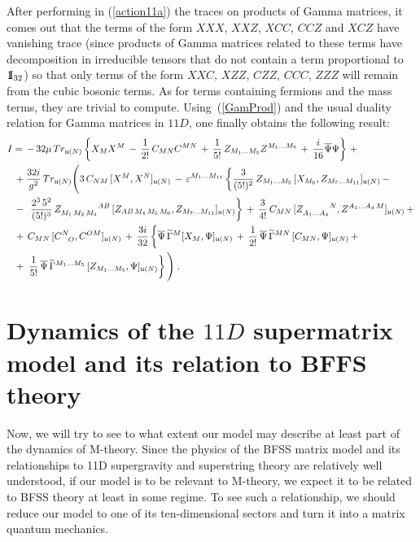 \documentclass[a4paper,11pt]{article}
\def\Id{{\rm 1\kern-.28em I}}
\begin{document}
After performing in (\ref{action11a}) the traces on products of
Gamma matrices, it comes out that the terms of the form $XXX$,
$XXZ$, $XCC$, $CCZ$ and $XCZ$ have vanishing trace (since products of Gamma matrices related to these terms 
have decomposition in irreducible tensors that do not contain a term proportional to $\Id_{32}$) 
so that only terms of the form $XXC$, $XZZ$, $CZZ$, $CCC$, $ZZZ$ will remain
from the cubic bosonic terms. As for  terms containing fermions and the mass terms,
they are trivial to compute. Using~(\ref{GamProd}) and the usual duality relation for Gamma matrices in $11D$, 
one finally obtains the following result:
\begin{align}\label{axxion}
I&=\,-\, 32 \mu \,Tr_{\mathfrak{u}(N)}\left\{ X_M X^M\,-\,\frac{1}{2!}\,C_{MN}C^{MN}\,+\,\frac{1}{5!}\,Z_{M_1\ldots M_5}
Z^{M_1\ldots M_5}\,+\,\frac{i}{16}\overline{\Psi}\Psi\right\}\,+\notag\\
&\,+\frac{32i}{g^2}\,Tr_{\mathfrak{u}(N)}\Bigg(3\,C_{NM}\,[X^{M},X^{N}]_{\mathfrak{u}(N)}\,-\,
\varepsilon^{M_1\ldots M_{11}}
\left\{\frac{3}{(5!)^2}\,Z_{M_1\ldots M_5}\,[X_{M_{6}},Z_{M_7\ldots M_{11}}]_{\mathfrak{u}(N)}
\,-\, \right.\notag\\ 
&\,-\ \left.\frac{2^3\,5^2}{(5!)^3}\,Z_{M_1\,M_2\,M_3}^{\phantom{M_1\,M_2\,M_3}AB}\,[
Z_{AB\,M_4\,M_5\,M_6},Z_{M_7\ldots M_{11}}]_{\mathfrak{u}(N)}\right\}
\,+\,\frac{3}{4!}\,C_{MN}\,[Z_{A_1\ldots A_4}^{\phantom{A_1\ldots A_4}N},Z^{A_1\ldots A_4\,M}]_{\mathfrak{u}(N)}\,+\,\notag\\
&\,+\,C_{MN}\,[C^{N}_{\phantom{N}O},C^{OM}]_{\mathfrak{u}(N)}
\,+\,\frac{3i}{32}\left\{\overline{\Psi}\,\widetilde{\Gamma}^M[X_M,\Psi]_{\mathfrak{u}(N)} \,+\,
\frac{1}{2!}\,\overline{\Psi}\,\widetilde{\Gamma}^{MN}\,[C_{MN},\Psi]_{\mathfrak{u}(N)}\,+\,\right.\\
&\,+\,\left. \frac{1}{5!}\, \overline{\Psi}\,\widetilde{\Gamma}^{M_1\ldots M_5}\,[
Z_{M_1\ldots M_5},\Psi]_{\mathfrak{u}(N)} \right\}\Bigg)\;.\notag
\end{align}

\section{Dynamics of the $11D$ supermatrix model and its relation to BFFS theory}

Now, we will try to see to what extent our model may describe at least part
of the dynamics of M-theory. Since the physics of the BFSS matrix model and its relationships 
to 11D supergravity and superstring theory are relatively well understood, if our model is 
to be relevant to M-theory, we expect it to be related to BFSS theory at least in some regime. 
To see such a relationship, we should reduce our model to one of its ten-dimensional sectors
and turn it into a matrix quantum mechanics.
\end{document}
